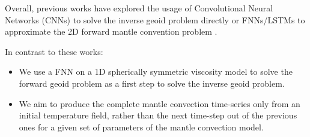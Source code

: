 Overall, previous works have explored the usage of Convolutional Neural Networks (CNNs) to solve the inverse geoid problem directly \citep{kerl2022geoid} or FNNs/LSTMs to approximate the 2D forward mantle convention problem \citep{10.1103_physrevfluids.6.113801}. 

In contrast to these works:
\begin{itemize}
    \item We use a FNN on a 1D spherically symmetric viscosity model to solve the forward geoid problem as a first step to solve the inverse geoid problem.
    
    \item We aim to produce the complete mantle convection time-series only from an initial temperature field, rather than the next time-step out of the previous ones for a given set of parameters of the mantle convection model.
\end{itemize}
